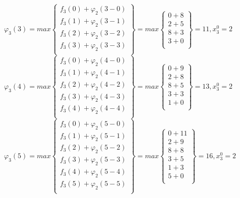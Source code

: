 $\varphi_3(3) = max \begin{Bmatrix}
    f_3(0) + \varphi_2(3 - 0) \\
    f_3(1) + \varphi_2(3 - 1) \\
    f_3(2) + \varphi_2(3 - 2) \\
    f_3(3) + \varphi_2(3 - 3) \\
\end{Bmatrix} = max \begin{Bmatrix}
    0 + 8 \\
    2 + 5 \\
    8 + 3 \\
    3 + 0 \\
\end{Bmatrix} = 11, x_3^0 = 2$\\

$\varphi_3(4) = max \begin{Bmatrix}
    f_3(0) + \varphi_2(4 - 0) \\
    f_3(1) + \varphi_2(4 - 1) \\
    f_3(2) + \varphi_2(4 - 2) \\
    f_3(3) + \varphi_2(4 - 3) \\
    f_3(4) + \varphi_2(4 - 4) \\
\end{Bmatrix} = max \begin{Bmatrix}
    0 + 9 \\
    2 + 8 \\
    8 + 5 \\
    3 + 3 \\
    1 + 0 \\
\end{Bmatrix} = 13, x_3^0 = 2$\\

$\varphi_3(5) = max \begin{Bmatrix}
    f_3(0) + \varphi_2(5 - 0) \\
    f_3(1) + \varphi_2(5 - 1) \\
    f_3(2) + \varphi_2(5 - 2) \\
    f_3(3) + \varphi_2(5 - 3) \\
    f_3(4) + \varphi_2(5 - 4) \\
    f_3(5) + \varphi_2(5 - 5) \\
\end{Bmatrix} = max \begin{Bmatrix}
    0 + 11 \\
    2 + 9 \\
    8 + 8 \\
    3 + 5 \\
    1 + 3 \\
    5 + 0 \\
\end{Bmatrix} = 16, x_3^0 = 2$\\

